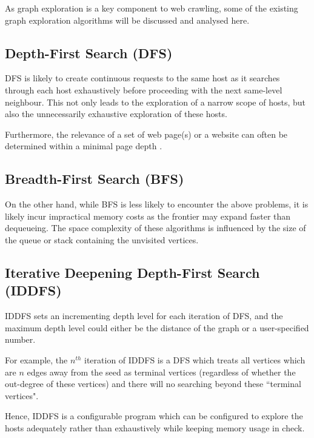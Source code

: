\documentclass{article}
\begin{document}
As graph exploration is a key component to web crawling, some of the existing graph exploration algorithms will be discussed and analysed here.

\subsection{Depth-First Search (DFS)}
DFS is likely to create continuous requests to the same host as it searches through each host exhaustively \cite{bib-03} before proceeding with the next same-level neighbour. This not only leads to the exploration of a narrow scope of hosts, but also the unnecessarily exhaustive exploration of these hosts.
\medskip

Furthermore, the relevance of a set of web page(s) or a website can often be determined within a minimal page depth \cite{bib-04}.

\begin{comment}
Note that there may be a few exceptions of the proposed scenario above, i.e. Wikipedia has many hyperlinks and citations on its pages, and it will be favourable to search through them exhaustively.
\end{comment}

\subsection{Breadth-First Search (BFS)}
On the other hand, while BFS is less likely to encounter the above problems, it is likely incur impractical memory costs as the frontier may expand faster than dequeueing. The space complexity of these algorithms is influenced by the size of the queue or stack containing the unvisited vertices.

\subsection{Iterative Deepening Depth-First Search (IDDFS)}
IDDFS sets an incrementing depth level for each iteration of DFS, and the maximum depth level could either be the distance of the graph or a user-specified number.
\medskip

For example, the $ n^{th} $ iteration of IDDFS is a DFS which treats all vertices which are $ n $ edges away from the seed as terminal vertices (regardless of whether the out-degree of these vertices) and there will no searching beyond these ``terminal vertices".
\medskip

Hence, IDDFS is a configurable program which can be configured to explore the hosts adequately rather than exhaustively while keeping memory usage in check.
\medskip
\end{document}
